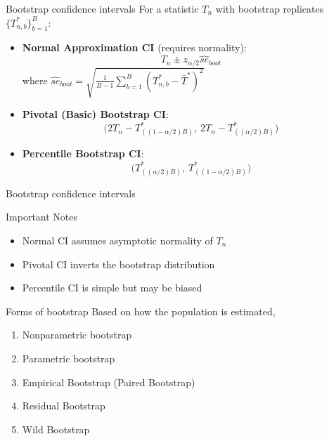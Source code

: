 \documentclass[
  ignorenonframetext,
]{beamer}
\providecommand{\tightlist}{%
  \setlength{\itemsep}{0pt}\setlength{\parskip}{0pt}}
\begin{document}
\begin{frame}{Bootstrap confidence intervals}
\protect{}\label{bootstrap-confidence-intervals}
For a statistic \(T_n\) with bootstrap replicates
\(\{T_{n,b}^*\}_{b=1}^B\):

\begin{itemize}
\item \textbf{Normal Approximation CI} (requires normality): \[
T_n \pm z_{\alpha/2}\widehat{se}_{boot}
\]
where $\widehat{se}_{boot}  = \sqrt{\frac{1}{B-1}\sum_{b=1}^B (T_{n,b}^* - \bar{T}^*)^2}$
\item \textbf{Pivotal (Basic) Bootstrap CI}:
\[
\Big(2T_n - T_{((1-\alpha/2)B)}^*, \ 2T_n - T_{((\alpha/2)B)}^*\Big)
\]

\item \textbf{Percentile Bootstrap CI}:
\[
\Big(T_{((\alpha/2)B)}^*, \ T_{((1-\alpha/2)B)}^*\Big)
\]
\end{itemize}
\end{frame}

\begin{frame}{Bootstrap confidence intervals}
\protect{}\label{bootstrap-confidence-intervals-1}
\begin{alertblock}{Important Notes}
\begin{itemize}
\item Normal CI assumes asymptotic normality of $T_n$
\item Pivotal CI inverts the bootstrap distribution
\item Percentile CI is simple but may be biased
\end{itemize}
\end{alertblock}
\end{frame}

\begin{frame}{Forms of bootstrap}
\protect{}\label{forms-of-bootstrap}
Based on how the population is estimated,

\begin{enumerate}
\tightlist
\item
  Nonparametric bootstrap
\item
  Parametric bootstrap
\item
  Empirical Bootstrap (Paired Bootstrap)
\item
  Residual Bootstrap
\item
  Wild Bootstrap
\end{enumerate}
\end{frame}
\end{document}
